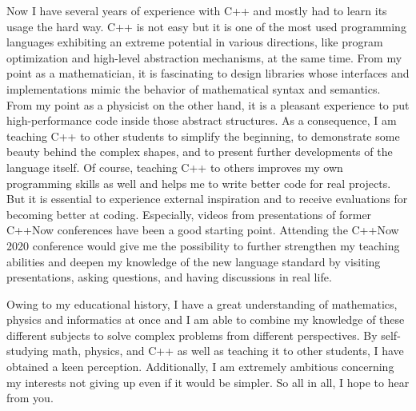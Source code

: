 \documentclass[ 10pt]{article}
\begin{document}
  Now I have several years of experience with C++ and mostly had to learn its usage the hard way.
  C++ is not easy but it is one of the most used programming languages exhibiting an extreme potential in various directions, like program optimization and high-level abstraction mechanisms, at the same time.
  From my point as a mathematician, it is fascinating to design libraries whose interfaces and implementations mimic the behavior of mathematical syntax and semantics.
  From my point as a physicist on the other hand, it is a pleasant experience to put high-performance code inside those abstract structures.
  As a consequence, I am teaching C++ to other students to simplify the beginning, to demonstrate some beauty behind the complex shapes, and to present further developments of the language itself.
  Of course, teaching C++ to others improves my own programming skills as well and helps me to write better code for real projects.
  But it is essential to experience external inspiration and to receive evaluations for becoming better at coding.
  Especially, videos from presentations of former C++Now conferences have been a good starting point.
  Attending the C++Now 2020 conference would give me the possibility to further strengthen my teaching abilities and deepen my knowledge of the new language standard by visiting presentations, asking questions, and having discussions in real life.

  Owing to my educational history, I have a great understanding of mathematics, physics and informatics at once and I am able to combine my knowledge of these different subjects to solve complex problems from different perspectives.
  By self-studying math, physics, and C++ as well as teaching it to other students, I have obtained a keen perception.
  Additionally, I am extremely ambitious concerning my interests not giving up even if it would be simpler.
  So all in all, I hope to hear from you.
\end{document}
